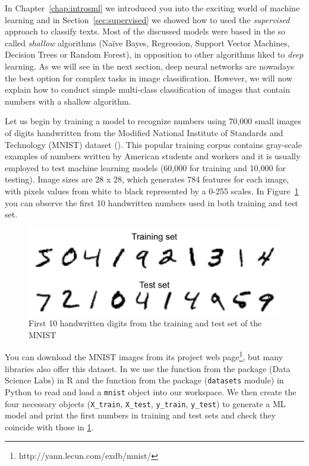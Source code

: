 In Chapter~\ref{chap:introsml} we introduced you into the exciting world of machine learning and in Section~\ref{sec:supervised} we showed how to used the \textit{supervised} approach to classify texts. Most of the discussed models were based in the so called \textit{shallow} algorithms (Naïve Bayes, Regression, Support Vector Machines, Decision Trees or Random Forest), in opposition to other algorithms liked to \textit{deep} learning. As we will see in the next section, deep neural networks are nowadays the best option for complex tasks in image classification. However, we will now explain how to conduct simple multi-class classification of images that contain numbers with a shallow algorithm.

Let us begin by training a model to recognize numbers using 70,000 small images of digits handwritten from the Modified National Institute of Standards and Technology (MNIST) dataset  (\cite{lecun1998gradient}). This popular training corpus contains gray-scale examples of numbers written by American students and workers and it is usually employed to test machine learning models (60,000 for training and 10,000 for testing). Image sizes are 28 x 28, which generates 784 features for each image, with pixels values from white to black represented by a 0-255 scales. In Figure~\ref{fig:numbers} you can observe the first 10 handwritten numbers used in both training and test set.

\begin{figure}
\centering
\includegraphics[width=0.9\linewidth]{figures/ch15_numbers.png}
\caption{First 10 handwritten digits from the training and test set of the MNIST}
\label{fig:numbers}
\end{figure}

You can download the MNIST images from its project web page\footnote{http://yann.lecun.com/exdb/mnist/}, but many libraries also offer this dataset. In  we use the  function from the  package (Data Science Labs) in R and the  function from the  package (\texttt{datasets} module) in Python to read and load a \texttt{mnist} object into our workspace. We then create the four necessary objects (\texttt{X\_train}, \texttt{X\_test}, \texttt{y\_train}, \texttt{y\_test}) to generate a ML model and print the first numbers in training and test sets and check they coincide with those in \ref{fig:numbers}.

